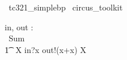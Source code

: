 
\begin{zsection}
  \SECTION\ tc321\_simplebp \parents\ circus\_toolkit
\end{zsection}

\begin{circus}
    \circchannel in, out : \nat   \\
    \circprocess\ Sum \circdef  \circbegin\  \\
   	 \t1 \circspot \circmu\ X \circspot in?x \then out!(x+x) \then X \\
    \circend
\end{circus}


